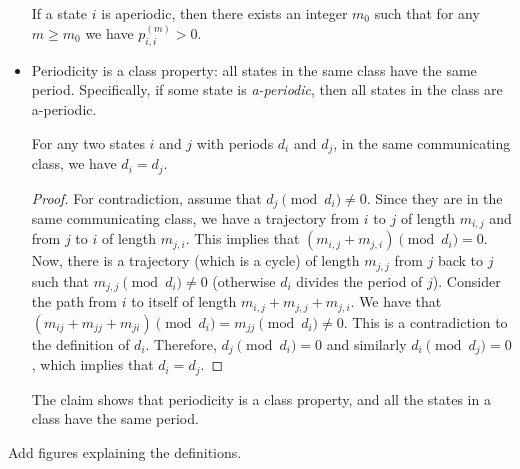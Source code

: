\begin{itemize}
If a state $i$ is aperiodic, then there exists an integer $m_0$ such
that for any $m\geq m_0$ we have $p_{i,i}^{(m)}>0$.
\item
Periodicity is a class property: all states in the same class
have the same period. Specifically, if some state is
\textit{a-periodic},
then all states in the class are a-periodic.\\
\begin{claim}
For any two states $i$ and $j$ with periods $d_i$ and $d_j$, in the
same communicating class, we have $d_i=d_j$.
\end{claim}
\begin{proof}
For contradiction, assume that $d_j \pmod {d_i}\neq 0$. Since they
are in the same communicating class, we have a trajectory from $i$
to $j$ of length $m_{i,j}$ and from $j$ to $i$ of length $m_{j,i}$.
This implies that $(m_{i,j}+m_{j,i})\pmod {d_i}=0$. Now, there is a
trajectory (which is a cycle) of length $m_{j,j}$ from $j$ back to
$j$ such that $m_{j,j}\pmod {d_i}\neq 0$ (otherwise $d_i$ divides
the period of $j$). Consider the path from $i$ to itself of length
$m_{i,j}+m_{j,j}+m_{j,i}$. We have that $(m_{ij}+m_{jj}+m_{ji})\pmod
{d_i} = m_{jj}\pmod {d_i} \neq 0$. This is a contradiction to the
definition of $d_i$. Therefore, $d_j \pmod {d_i}=0$ and similarly
$d_i \pmod {d_j}=0$, which implies that $d_i=d_j$.
\end{proof}
The claim shows that periodicity is a class property, and all the
states in a class have the same period.
\end{itemize}

\begin{example}
Add figures explaining the definitions.
\end{example}

